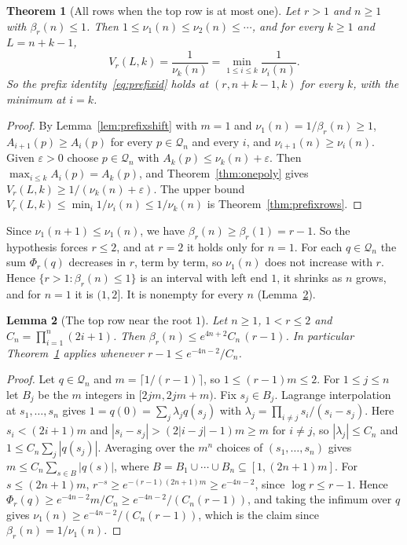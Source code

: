 \documentclass[11pt]{article}
\newtheorem{theorem}{Theorem}[section]
\newtheorem{lemma}[theorem]{Lemma}
\begin{document}
\begin{theorem}[All rows when the top row is at most one]\label{thm:onepolyrows}
Let $r>1$ and $n\ge1$ with $\beta_r(n)\le1$.  Then
$1\le\nu_1(n)\le\nu_2(n)\le\cdots$, and for every $k\ge1$ and $L=n+k-1$,
\[
  V_r(L,k)=\frac1{\nu_k(n)}=\min_{1\le i\le k}\frac1{\nu_i(n)} .
\]
So the prefix identity~\eqref{eq:prefixid} holds at $(r,n+k-1,k)$
for every $k$, with the minimum at $i=k$.
\end{theorem}

\begin{proof}
By Lemma~\ref{lem:prefixshift} with $m=1$ and $\nu_1(n)=1/\beta_r(n)\ge1$,
$A_{i+1}(p)\ge A_i(p)$ for every $p\in\mathcal Q_n$ and every $i$, and
$\nu_{i+1}(n)\ge\nu_i(n)$.  Given $\varepsilon>0$ choose $p\in\mathcal Q_n$
with $A_k(p)\le\nu_k(n)+\varepsilon$.  Then
$\max_{i\le k}A_i(p)=A_k(p)$, and Theorem~\ref{thm:onepoly} gives
$V_r(L,k)\ge1/(\nu_k(n)+\varepsilon)$.  The upper bound
$V_r(L,k)\le\min_i1/\nu_i(n)\le1/\nu_k(n)$ is Theorem~\ref{thm:prefixrows}.
\end{proof}

Since $\nu_1(n+1)\le\nu_1(n)$, we have $\beta_r(n)\ge\beta_r(1)=r-1$.  So the
hypothesis forces $r\le2$, and at $r=2$ it holds only for $n=1$.  For each
$q\in\mathcal Q_n$ the sum $\Phi_r(q)$ decreases in $r$, term by term, so
$\nu_1(n)$ does not increase with $r$.  Hence
$\{r>1:\beta_r(n)\le1\}$ is an interval with left end $1$, it shrinks as $n$
grows, and for $n=1$ it is $(1,2]$.  It is nonempty for every $n$ (Lemma~\ref{lem:topnearone}).

\begin{lemma}[The top row near the root $1$]\label{lem:topnearone}
Let $n\ge1$, $1<r\le2$ and $C_n=\prod_{i=1}^n(2i+1)$.  Then
$\beta_r(n)\le e^{4n+2}C_n\,(r-1)$.  In particular Theorem~\ref{thm:onepolyrows}
applies whenever $r-1\le e^{-4n-2}/C_n$.
\end{lemma}

\begin{proof}
Let $q\in\mathcal Q_n$ and $m=\lceil1/(r-1)\rceil$, so $1\le(r-1)m\le2$.
For $1\le j\le n$ let $B_j$ be the $m$ integers in $[2jm,2jm+m)$.  Fix
$s_j\in B_j$.  Lagrange interpolation at $s_1,\ldots,s_n$ gives
$1=q(0)=\sum_j\lambda_jq(s_j)$ with
$\lambda_j=\prod_{i\ne j}s_i/(s_i-s_j)$.  Here $s_i<(2i+1)m$ and
$|s_i-s_j|>(2|i-j|-1)m\ge m$ for $i\ne j$, so $|\lambda_j|\le C_n$ and
$1\le C_n\sum_j|q(s_j)|$.  Averaging over the $m^n$ choices of
$(s_1,\ldots,s_n)$ gives $m\le C_n\sum_{s\in B}|q(s)|$, where
$B=B_1\cup\cdots\cup B_n\subseteq[1,(2n+1)m]$.  For $s\le(2n+1)m$,
$r^{-s}\ge e^{-(r-1)(2n+1)m}\ge e^{-4n-2}$, since $\log r\le r-1$.  Hence
$\Phi_r(q)\ge e^{-4n-2}m/C_n\ge e^{-4n-2}/(C_n(r-1))$, and taking the
infimum over $q$ gives $\nu_1(n)\ge e^{-4n-2}/(C_n(r-1))$, which is the
claim since $\beta_r(n)=1/\nu_1(n)$.
\end{proof}
\end{document}
